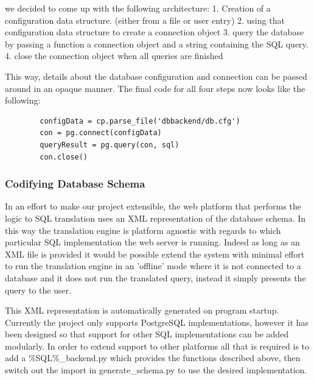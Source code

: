 \documentclass[a4paper, 11pt]{article}
\begin{document}
      we decided to come up with the following architecture: 
      1. Creation of a configuration data structure. (either from a file or user
         entry)
      2. using that configuration data structure to create a connection object
      3. query the database by passing a function a connection object and a
      string containing the SQL query.
      4. close the connection object when all queries are finished

      This way, details about the database configuration and connection 
      can be passed around in an opaque manner. The final code for all four
      steps now looks like the following: 

      \begin{verbatim}
        configData = cp.parse_file('dbbackend/db.cfg')
        con = pg.connect(configData)
        queryResult = pg.query(con, sql)
        con.close()
      \end{verbatim}

    \subsubsection{Codifying Database Schema}
      In an effort to make our project extensible, the web platform that performs 
      the logic to SQL translation uses an XML representation of the database
      schema. In this way the translation engine is platform agnostic with
      regards to which particular SQL implementation the web server is running.
      Indeed as long as an XML file is provided it would be possible extend the
      system with minimal effort to run the translation engine in an 'offline' mode 
      where it is not connected to a database and it does not run the translated 
      query, instead it simply presents the query to the user.

      This XML representation is automatically generated on program startup.
      Currently the project only supports PostgreSQL implementations, however it
      has been designed so that support for other SQL implementations can be
      added modularly. In order to extend support to other platforms all that is
      required is to add a \%SQL\%\_backend.py which provides the functions
      described above, then switch out the import in generate\_schema.py to use
      the desired implementation.

\end{document}
